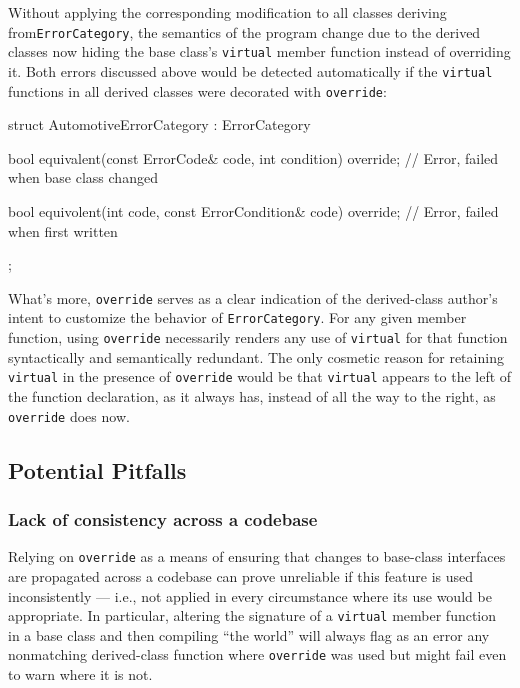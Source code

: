 Without applying the corresponding modification to all classes deriving
from\linebreak[4] \lstinline!ErrorCategory!, the semantics of the program change due to
the derived classes now hiding
the base class's
\lstinline!virtual! member function instead of overriding it. Both errors discussed above
would be detected automatically if the \lstinline!virtual!
functions in all derived classes were decorated with \lstinline!override!:

\begin{emcppslisting}[emcppsbatch=e2]
struct AutomotiveErrorCategory : ErrorCategory
{
    bool equivalent(const ErrorCode& code, int condition) override;
        // Error, failed when base class changed

    bool equivolent(int code, const ErrorCondition& code) override;
        // Error, failed when first written
};
\end{emcppslisting}

\noindent What's more, \lstinline!override! serves as a clear indication of the derived-class author's intent to customize the
behavior of \lstinline!ErrorCategory!. For any given member function, using \lstinline!override! necessarily renders any use of \lstinline!virtual! for
that function syntactically and semantically redundant. The only
cosmetic reason for retaining \lstinline!virtual! in the presence of
\lstinline!override! would be that \lstinline!virtual! appears to the left of
the function declaration, as it always has, instead of all the way to
the right, as \lstinline!override! does now.

\subsection[Potential Pitfalls]{Potential Pitfalls}\label{potential-pitfalls}

\subsubsection[Lack of consistency across a codebase]{Lack of consistency across a codebase}\label{lack-of-consistency-across-a-codebase}

Relying on \lstinline!override! as a means of ensuring that changes to
base-class interfaces are propagated across a codebase can prove
unreliable if this feature is used inconsistently --- i.e., not applied in every circumstance where its use would be appropriate. In
particular, altering the signature of a \lstinline!virtual! member function
in a base class and then compiling ``the world'' will always flag as an
error any nonmatching derived-class function where \lstinline!override!
was used but might fail even to warn where it is not.

